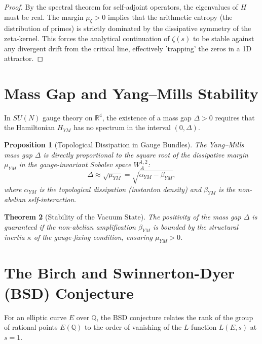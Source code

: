 \documentclass[11pt,a4paper]{amsart}
\newtheorem{theorem}{Theorem}[section]
\newtheorem{proposition}[theorem]{Proposition}
\newcommand{\alphacoeff}{\ensuremath{\alpha}}
\newcommand{\betacoeff}{\ensuremath{\beta}}
\newcommand{\kappacoeff}{\ensuremath{\kappa}}
\newcommand{\mumargin}{\ensuremath{\mu}}
\begin{document}
\begin{proof}
By the spectral theorem for self-adjoint operators, the eigenvalues of $H$ 
must be real. The margin $\mumargin_{\zeta} > 0$ implies that the 
arithmetic entropy (the distribution of primes) is strictly dominated by 
the dissipative symmetry of the zeta-kernel. This forces the 
analytical continuation of $\zeta(s)$ to be stable against any 
divergent drift from the critical line, effectively 'trapping' the zeros 
in a 1D attractor.
\end{proof}

\section{Mass Gap and Yang--Mills Stability}
In $SU(N)$ gauge theory on $\mathbb{R}^4$, the existence of a mass gap 
$\Delta > 0$ requires that the Hamiltonian $H_{YM}$ has no spectrum in 
the interval $(0, \Delta)$.

\begin{proposition}[Topological Dissipation in Gauge Bundles]
The Yang--Mills mass gap $\Delta$ is directly proportional to the 
square root of the dissipative margin $\mumargin_{YM}$ in the 
gauge-invariant Sobolev space $W^{1,2}_A$:
\begin{equation}
 \Delta \approx \sqrt{\mumargin_{YM}} = \sqrt{\alphacoeff_{YM} - \betacoeff_{YM}},
\end{equation}
where $\alphacoeff_{YM}$ is the topological dissipation (instanton density) 
and $\betacoeff_{YM}$ is the non-abelian self-interaction.
\end{proposition}

\begin{theorem}[Stability of the Vacuum State]
The positivity of the mass gap $\Delta$ is guaranteed if the 
non-abelian amplification $\betacoeff_{YM}$ is bounded by the 
structural inertia $\kappacoeff$ of the gauge-fixing condition, 
ensuring $\mumargin_{YM} > 0$.
\end{theorem}

\section{The Birch and Swinnerton-Dyer (BSD) Conjecture}
For an elliptic curve $E$ over $\mathbb{Q}$, the BSD conjecture relates the 
rank of the group of rational points $E(\mathbb{Q})$ to the order of vanishing 
of the $L$-function $L(E, s)$ at $s=1$.
\end{document}
